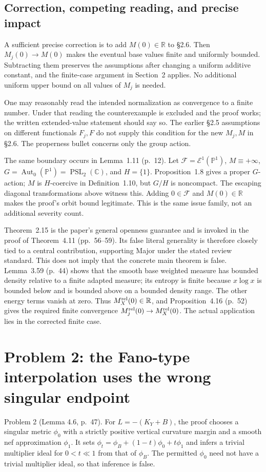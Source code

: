 \documentclass[10pt]{article}
\begin{document}
\subsection*{Correction, competing reading, and precise impact}
A sufficient precise correction is to add \(M(0)\in\mathbb R\) to §2.6. Then \(M_j(0)\to M(0)\) makes the eventual base values finite and uniformly bounded. Subtracting them preserves the assumptions after changing a uniform additive constant, and the finite-case argument in Section 2 applies. No additional uniform upper bound on all values of \(M_j\) is needed.\par
One may reasonably read the intended normalization as convergence to a finite number. Under that reading the counterexample is excluded and the proof works; the written extended-value statement should say so. The earlier §2.5 assumptions on different functionals \(F_j,F\) do not supply this condition for the new \(M_j,M\) in §2.6. The properness bullet concerns only the group action.\par
The same boundary occurs in Lemma 1.11 (p. 12). Let \(\mathcal F=\mathcal E^1(\mathbb P^1)\), \(M\equiv+\infty\), \(G=\operatorname{Aut}_0(\mathbb P^1)=\operatorname{PSL}_2(\mathbb C)\), and \(H=\{1\}\). Proposition 1.8 gives a proper \(G\)-action; \(M\) is \(H\)-coercive in Definition 1.10, but \(G/H\) is noncompact. The escaping diagonal transformations above witness this. Adding \(0\in\mathcal F\) and \(M(0)\in\mathbb R\) makes the proof’s orbit bound legitimate. This is the same issue family, not an additional severity count.\par
Theorem 2.15 is the paper’s general openness guarantee and is invoked in the proof of Theorem 4.11 (pp. 56–59). Its false literal generality is therefore closely tied to a central contribution, supporting Major under the stated review standard. This does not imply that the concrete main theorem is false. Lemma 3.59 (p. 44) shows that the smooth base weighted measure has bounded density relative to a finite adapted measure; its entropy is finite because \(x\log x\) is bounded below and is bounded above on a bounded density range. The other energy terms vanish at zero. Thus \(M_X^{\rm rel}(0)\in\mathbb R\), and Proposition 4.16 (p. 52) gives the required finite convergence \(M_j^{\rm rel}(0)\to M_X^{\rm rel}(0)\). The actual application lies in the corrected finite case.\par
\section*{Problem 2: the Fano-type interpolation uses the wrong singular endpoint}
Problem 2 (Lemma 4.6, p. 47).  For \(L=-(K_Y+B)\), the proof chooses a singular metric \(\phi_0\) with a strictly positive vertical curvature margin and a smooth nef approximation \(\phi_1\). It sets \(\phi_t=\phi_B+(1-t)\phi_0+t\phi_1\) and infers a trivial multiplier ideal for \(0<t\ll1\) from that of \(\phi_B\). The permitted \(\phi_0\) need not have a trivial multiplier ideal, so that inference is false.\par
\end{document}
